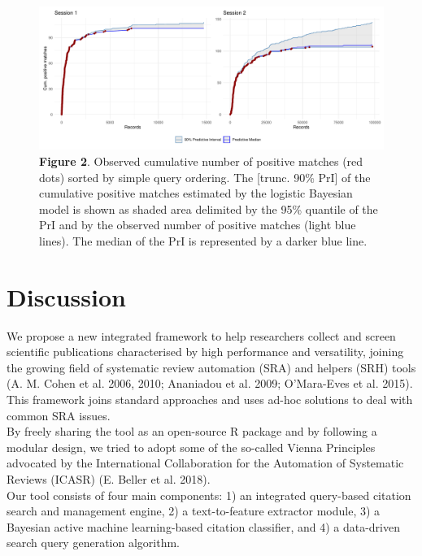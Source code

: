 \documentclass{article}
\begin{document}
\begin{figure}
\centering
\includegraphics{Manuscript_files/figure-latex/performance plot-1.pdf}
\caption{\textbf{Figure 2}. Observed cumulative number of positive
matches (red dots) sorted by simple query ordering. The {[}trunc. 90\%
PrI{]} of the cumulative positive matches estimated by the logistic
Bayesian model is shown as shaded area delimited by the 95\% quantile of
the PrI and by the observed number of positive matches (light blue
lines). The median of the PrI is represented by a darker blue line.}
\end{figure}

\hypertarget{discussion}{%
\section{Discussion}\label{discussion}}

We propose a new integrated framework to help researchers collect and
screen scientific publications characterised by high performance and
versatility, joining the growing field of systematic review automation
(SRA) and helpers (SRH) tools (A. M. Cohen et al. 2006, 2010; Ananiadou
et al. 2009; O'Mara-Eves et al. 2015). This framework joins standard
approaches and uses ad-hoc solutions to deal with common SRA issues.\\
By freely sharing the tool as an open-source R package and by following
a modular design, we tried to adopt some of the so-called Vienna
Principles advocated by the International Collaboration for the
Automation of Systematic Reviews (ICASR) (E. Beller et al. 2018).\\
Our tool consists of four main components: 1) an integrated query-based
citation search and management engine, 2) a text-to-feature extractor
module, 3) a Bayesian active machine learning-based citation classifier,
and 4) a data-driven search query generation algorithm.\\
\end{document}
